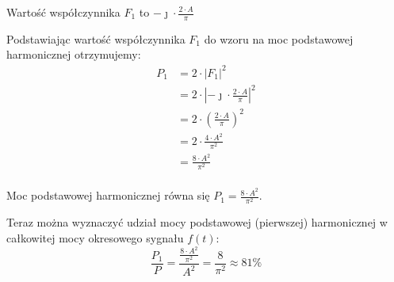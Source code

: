 \begin{task}
Wartość współczynnika $F_1$ to $-\jmath \cdot \frac{2 \cdot A}{\pi}$

Podstawiając wartość współczynnika $F_1$ do wzoru na moc podstawowej harmonicznej otrzymujemy:
\begin{align*}
P_1&=2 \cdot \left|F_{1}\right|^2\\
&=2 \cdot \left|-\jmath \cdot \frac{2 \cdot A}{\pi}\right|^2\\
&=2 \cdot \left(\frac{2 \cdot A}{\pi}\right)^2\\
&=2 \cdot \frac{4 \cdot A^2}{\pi^2}\\
&=\frac{8 \cdot A^2}{\pi^2}\\
\end{align*}

Moc podstawowej harmonicznej równa się $P_1=\frac{8 \cdot A^2}{\pi^2}$.

Teraz można wyznaczyć udział mocy podstawowej (pierwszej) harmonicznej w całkowitej mocy okresowego sygnału $f(t)$:
\begin{equation}
\frac{P_1}{P} = \frac{\frac{8 \cdot A^2}{\pi^2}}{A^2} = \frac{8}{\pi^2} \approx 81\%
\end{equation}


\end{task}